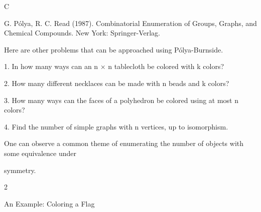 \documentclass[a4paper,portrait,12pt]{article}
\begin{document}
\begin{flushleft}
C
\end{flushleft}





\begin{flushleft}
G. P\'{o}lya, R. C. Read (1987). Combinatorial Enumeration of Groups, Graphs, and Chemical Compounds. New York: Springer-Verlag.
\end{flushleft}





\begin{flushleft}
Here are other problems that can be approached using P\'{o}lya-Burnside.
\end{flushleft}


\begin{flushleft}
1. In how many ways can an n × n tablecloth be colored with k colors?
\end{flushleft}


\begin{flushleft}
2. How many different necklaces can be made with n beads and k colors?
\end{flushleft}


\begin{flushleft}
3. How many ways can the faces of a polyhedron be colored using at most n colors?
\end{flushleft}


\begin{flushleft}
4. Find the number of simple graphs with n vertices, up to isomorphism.
\end{flushleft}


\begin{flushleft}
One can observe a common theme of enumerating the number of objects with some equivalence under
\end{flushleft}


\begin{flushleft}
symmetry.
\end{flushleft}





2





\begin{flushleft}
An Example: Coloring a Flag
\end{flushleft}
\end{document}

